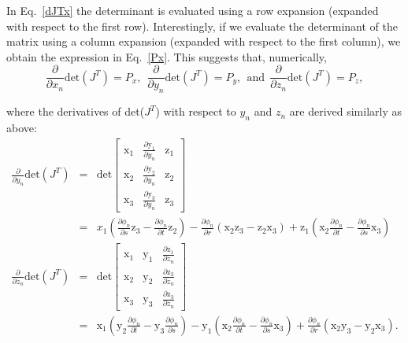 %
In Eq.\ \eqref{dJTx} the determinant is evaluated using a row expansion (expanded with respect to the first row). Interestingly, if we evaluate the determinant of the matrix using a column expansion (expanded with respect to the first column), we obtain the expression in Eq.\ \eqref{Px}. This suggests that, numerically, 
%
\begin{equation}
\frac{\partial}{\partial x_n} \text{det}(J^T) = P_x, \ \ \frac{\partial}{\partial y_n} \text{det}(J^T) = P_y, \ \ \text{and} \ \ \frac{\partial}{\partial z_n} \text{det}(J^T) = P_z,
\label{ddet_equal_P}
\end{equation}
%

where the derivatives of det($J^T$) with respect to $y_n$ and $z_n$ are derived similarly as above: 
%
\begin{eqnarray}
%
\frac{\partial}{\partial y_n} \text{det}(J^T) &=& \text{det}
%
\begin{bmatrix}
\text{x}_1 & \frac{\partial \text{y}_1}{\partial y_n} & \text{z}_1 \\
\text{x}_2 & \frac{\partial \text{y}_2}{\partial y_n} & \text{z}_2 \\
\text{x}_3 & \frac{\partial \text{y}_3}{\partial y_n} & \text{z}_3
\end{bmatrix} \nonumber\\
%
&=& x_1 \left(\frac{\partial \phi_n}{\partial s} \text{z}_3 - \frac{\partial \phi_n}{\partial t} \text{z}_2\right) - \frac{\partial \phi_n}{\partial r} \left(  \text{x}_2 \text{z}_3 - \text{z}_2 \text{x}_3 \right) + \text{z}_1 \left(  \text{x}_2 \frac{\partial \phi_n}{\partial t} - \frac{\partial \phi_n}{\partial s} \text{x}_3 \right) \nonumber\\
\frac{\partial}{\partial z_n} \text{det}(J^T) &=& \text{det}
%
\begin{bmatrix}
\text{x}_1 & \text{y}_1 & \frac{\partial \text{z}_1}{\partial z_n}  \\
\text{x}_2 & \text{y}_2 & \frac{\partial \text{z}_2}{\partial z_n}  \\
\text{x}_3 & \text{y}_3& \frac{\partial \text{z}_3}{\partial z_n}
\end{bmatrix} \nonumber\\
%
&=&  \text{x}_1 \left(\text{y}_2 \frac{\partial \phi_n}{\partial  t} - \text{y}_3 \frac{\partial \phi_n}{\partial s}\right) - \text{y}_1 \left( \text{x}_2 \frac{\partial \phi_n}{\partial t} - \frac{\partial \phi_n}{\partial s} \text{x}_3 \right) + \frac{\partial \phi_n}{\partial r} \left( \text{x}_2 \text{y}_3 - \text{y}_2 \text{x}_3 \right) . \nonumber\\
%
\label{dJT}
\end{eqnarray}

